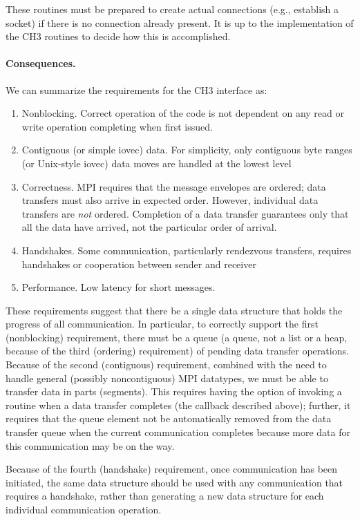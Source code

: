 \documentclass{article}
\begin{document}
These routines must be prepared to create actual connections (e.g., establish
a socket) if there is no connection already present.  It is up to the
implementation of the CH3 routines to decide how this is accomplished.

\paragraph{Consequences.}
We can summarize the requirements for the CH3 interface as:
\begin{enumerate}
\item Nonblocking.  Correct operation of the code is not dependent on any read
  or write operation completing when first issued.  
\item Contiguous (or simple iovec) data.  For simplicity, only contiguous byte
  ranges (or Unix-style iovec) data moves are handled at the lowest level
\item Correctness.  MPI requires that the message envelopes are ordered; data
  transfers must also arrive in expected order.  However, individual
data transfers are \emph{not} ordered.  Completion of a data transfer
guarantees only that all the data have arrived, not the particular
order of arrival.
\item Handshakes.  Some communication, particularly rendezvous transfers,
  requires handshakes or cooperation between sender and receiver
\item Performance.  Low latency for short messages.
\end{enumerate}
These requirements suggest that there be a single data structure that holds
the progress of all communication. 
In particular, to correctly support the first (nonblocking) requirement, there
must be a queue (a queue, not a list or a heap, because of the third
(ordering) requirement) of 
pending data transfer operations.  
Because of the second (contiguous) requirement, combined with the need to
handle general (possibly noncontiguous) MPI datatypes, we must be able to
transfer data in parts (segments).  This requires having the option of
invoking a routine when a data transfer completes (the callback described
above); further, it requires that the queue element not be automatically
removed from the data transfer queue when the current communication completes
because more data for this communication may be on the way.

Because of the fourth (handshake) requirement, once communication has been
initiated, the same data structure should be used with any communication that
requires a handshake, rather than generating a new data structure for each
individual communication operation.  
\end{document}
